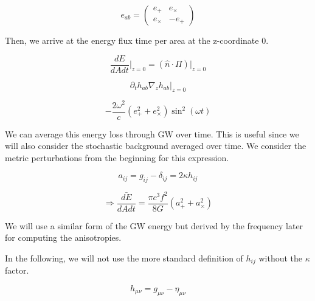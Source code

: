 \begin{equation}
    e_{ab}=
    \begin{pmatrix}
        e_+ & e_\times \\
        e_\times & -e_+
    \end{pmatrix}
\end{equation}

Then, we arrive at the energy flux time per area at the z-coordinate 0.

\begin{equation}
    \frac{dE}{dAdt}\left.\right|_{z=0} = (\hat{n}\cdot \Pi)\left.\right|_{z=0}
\end{equation}

\begin{equation}
    \partial_t h_{ab}\nabla_z h_{ab}\left.\right|_{z=0}
\end{equation}

\begin{equation}
    -\frac{2\omega^2}{c}(e_+^2 + e_\times^2)\sin^2(\omega t)
\end{equation}

We can average this energy loss through GW over time. This is useful since we will also consider the stochastic background averaged over time. We consider the metric perturbations from the beginning for this expression.

\begin{equation}
    a_{ij}=g_{ij}-\delta_{ij}=2\kappa h_{ij}
\end{equation}

\begin{equation}
    \Rightarrow \bar{\frac{dE}{dAdt}}=\frac{\pi c^3f^2}{8G}(a_+^2+a_\times^2)
\end{equation}

We will use a similar form of the GW energy but derived by the frequency later for computing the anisotropies.

In the following, we will not use the more standard definition of $h_{ij}$ without the $\kappa$ factor.

\begin{equation}
    h_{\mu\nu} = g_{\mu\nu}-\eta_{\mu\nu}
\end{equation}

